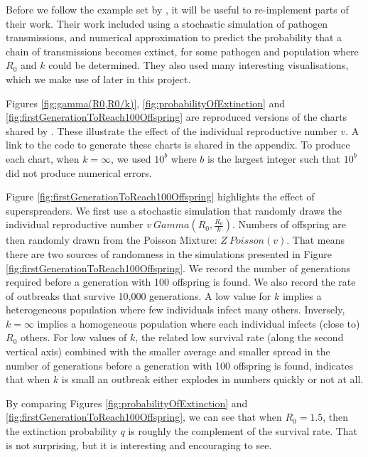 \documentclass[hidelinks]{article}
\begin{document}
Before we follow the example set by \citet{LloydSmith2005}, it will be useful to re-implement parts of their work. Their work included using a stochastic simulation of pathogen transmissions, and numerical approximation to predict the probability that a chain of transmissions becomes extinct, for some pathogen and population where $ R_0 $ and $ k $ could be determined. They also used many interesting visualisations, which we make use of later in this project.

Figures \ref{fig:gamma(R0,R0/k)}, \ref{fig:probabilityOfExtinction} and \ref{fig:firstGenerationToReach100Offspring} are reproduced versions of the charts shared by \citet{LloydSmith2005}. These illustrate the effect of the individual reproductive number $ v $. A link to the code to generate these charts is shared in the appendix. To produce each chart, when $ k = \infty $, we used $ 10^b $ where $ b $ is the largest integer such that $ 10^b $ did not produce numerical errors.

Figure \ref{fig:firstGenerationToReach100Offspring} highlights the effect of superspreaders. We first use a stochastic simulation that randomly draws the individual reproductive number $ v ~ Gamma\left(R_0, \frac{R_0}{k}\right) $. Numbers of offspring are then randomly drawn from the Poisson Mixture: $ Z ~ Poisson(v) $. That means there are two sources of randomness in the simulations presented in Figure \ref{fig:firstGenerationToReach100Offspring}. We record the number of generations required before a generation with 100 offspring is found. We also record the rate of outbreaks that survive 10,000 generations. A low value for $ k $ implies a heterogeneous population where few individuals infect many others. Inversely, $ k = \infty $ implies a homogeneous population where each individual infects (close to) $ R_0 $ others. For low values of $ k $, the related low survival rate (along the second vertical axis) combined with the smaller average and smaller spread in the number of generations before a generation with 100 offspring is found, indicates that when $ k $ is small an outbreak either explodes in numbers quickly or not at all.

By comparing Figures \ref{fig:probabilityOfExtinction} and \ref{fig:firstGenerationToReach100Offspring}, we can see that when $ R_0=1.5 $, then the extinction probability $ q $ is roughly the complement of the survival rate. That is not surprising, but it is interesting and encouraging to see.
\end{document}
